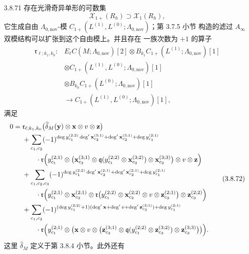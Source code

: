 \begin{theorem}{3.8.71}\label{thm:3-8-71}
存在光滑奇异单形的可数集
\[
 \mathcal X_{1+}(R_h)\supset\mathcal X_1(R_h),
\]
它生成自由 $\Lambda_{0,\mathrm{nov}}$-模
$C_{1+}(L^{(1)},L^{(0)};\Lambda_{0,\mathrm{nov}})$；第 3.7.5 小节
构造的滤过 $A_\infty$ 双模结构可以扩张到这个自由模上。并且存在
一族次数为 $+1$ 的算子
\[
\begin{aligned}
 \mathfrak r_{\ell;k_1,k_0}\colon&
 E_\ell C(M;\Lambda_{0,\mathrm{nov}})[2]
 \otimes
 B_{k_1}C_{1+}(L^{(1)};\Lambda_{0,\mathrm{nov}})[1]\\
 &\otimes
 C_{1+}(L^{(1)},L^{(0)};\Lambda_{0,\mathrm{nov}})[1]\\
 &\otimes
 B_{k_0}C_{1+}(L^{(0)};\Lambda_{0,\mathrm{nov}})[1]\\
 &\longrightarrow
 C_{1+}(L^{(1)},L^{(0)};\Lambda_{0,\mathrm{nov}})[1],
\end{aligned}
\]
满足
\begin{equation}
\begin{aligned}
0={}&
 \mathfrak r_{\ell;k_1,k_0}
 \bigl(
 \widehat\delta_M(\mathbf y)
 \otimes\mathbf x\otimes v\otimes\mathbf z
 \bigr)\\
&+
 \sum_{c_1,c_2}
 (-1)^{
  \deg y_{c_1}^{(2;2)}
   \deg'\mathbf x_{c_2}^{(3;1)}
  +\deg'\mathbf x_{c_2}^{(3;1)}
  +\deg y_{c_1}^{(2;1)}}\\
&\qquad\cdot
 \mathfrak r\Bigl(
 y_{c_1}^{(2;1)}
 \otimes
 \bigl(
 \mathbf x_{c_2}^{(3;1)}
 \otimes
 \mathfrak q(
 y_{c_1}^{(2;2)}
 \otimes\mathbf x_{c_2}^{(3;2)})
 \otimes\mathbf x_{c_2}^{(3;3)}
 \bigr)
 \otimes v\otimes\mathbf z
 \Bigr)\\
&+
 \sum_{c_1,c_2,c_3}
 (-1)^{
  \deg y_{c_1}^{(2;2)}
   \deg'\mathbf x_{c_2}^{(2;1)}
  +\deg'\mathbf x_{c_2}^{(2;1)}
  +\deg y_{c_1}^{(2;1)}}\\
&\qquad\cdot
 \mathfrak r\Bigl(
 y_{c_1}^{(2;1)}
 \otimes\mathbf x_{c_2}^{(2;1)}
 \otimes
 \mathfrak r\bigl(
 y_{c_1}^{(2;2)}
 \otimes\mathbf x_{c_2}^{(2;2)}
 \otimes v\otimes\mathbf z_{c_3}^{(2;1)}
 \bigr)
 \otimes\mathbf z_{c_3}^{(2;2)}
 \Bigr)\\
&+
 \sum_{c_1,c_3}
 (-1)^{
  (\deg y_{c_1}^{(2;2)}+1)
  (\deg'\mathbf x+\deg'v+
   \deg'\mathbf z_{c_3}^{(3;1)})
  +\deg y_{c_1}^{(2;1)}}\\
&\qquad\cdot
 \mathfrak r\Bigl(
 y_{c_1}^{(2;1)}
 \otimes
 \bigl(
 \mathbf x\otimes v\otimes
 \bigl(
 \mathbf z_{c_3}^{(3;1)}
 \otimes
 \mathfrak q(
 y_{c_1}^{(2;2)}
 \otimes\mathbf z_{c_3}^{(3;2)})
 \otimes\mathbf z_{c_3}^{(3;3)}
 \bigr)
 \bigr)
 \Bigr).
\end{aligned}
\tag{3.8.72}\label{eq:3-8-72}
\end{equation}
这里 $\widehat\delta_M$ 定义于第 3.8.4 小节。此外还有


\end{theorem}
